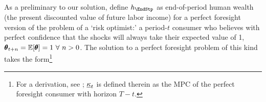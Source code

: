   As a preliminary to our solution, define $\hNrm_{\EndStp}$ as end-of-period human wealth (the present discounted value of future labor income) for a perfect foresight version of the problem of a `risk optimist:' a period-$t$ consumer who believes with perfect confidence that the shocks will always take their expected value of   {1, $\pmb{\theta}_{t+n} = \operatorname{\mathbb{E}}[\pmb{\theta}]=1~\forall~n>0$.}  The solution to a perfect foresight problem of this kind takes the form\footnote{For a derivation, see \cite{BufferStockTheory}; $\MPCmin_{t}$ is defined therein as the MPC of the perfect foresight consumer with horizon $T-t$.}
